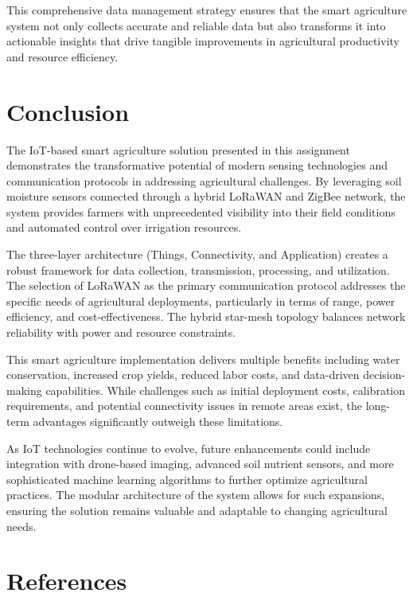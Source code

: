 \documentclass[12pt,a4paper]{article}
\begin{document}
This comprehensive data management strategy ensures that the smart agriculture system not only collects accurate and reliable data but also transforms it into actionable insights that drive tangible improvements in agricultural productivity and resource efficiency.

\section{Conclusion}

The IoT-based smart agriculture solution presented in this assignment demonstrates the transformative potential of modern sensing technologies and communication protocols in addressing agricultural challenges. By leveraging soil moisture sensors connected through a hybrid LoRaWAN and ZigBee network, the system provides farmers with unprecedented visibility into their field conditions and automated control over irrigation resources.

The three-layer architecture (Things, Connectivity, and Application) creates a robust framework for data collection, transmission, processing, and utilization. The selection of LoRaWAN as the primary communication protocol addresses the specific needs of agricultural deployments, particularly in terms of range, power efficiency, and cost-effectiveness. The hybrid star-mesh topology balances network reliability with power and resource constraints.

This smart agriculture implementation delivers multiple benefits including water conservation, increased crop yields, reduced labor costs, and data-driven decision-making capabilities. While challenges such as initial deployment costs, calibration requirements, and potential connectivity issues in remote areas exist, the long-term advantages significantly outweigh these limitations.

As IoT technologies continue to evolve, future enhancements could include integration with drone-based imaging, advanced soil nutrient sensors, and more sophisticated machine learning algorithms to further optimize agricultural practices. The modular architecture of the system allows for such expansions, ensuring the solution remains valuable and adaptable to changing agricultural needs.

\section{References}
\end{document}
